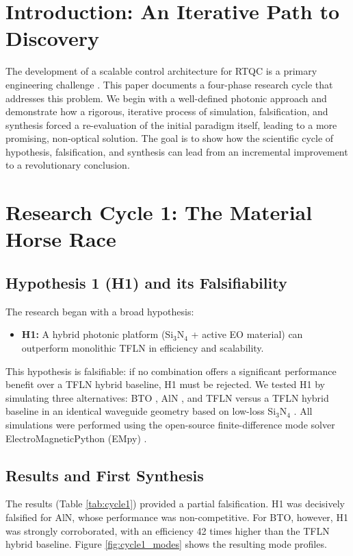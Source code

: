 \documentclass{article}
\begin{document}
\section{Introduction: An Iterative Path to Discovery}
The development of a scalable control architecture for RTQC is a primary engineering challenge \cite{TFLNreview}. This paper documents a four-phase research cycle that addresses this problem. We begin with a well-defined photonic approach and demonstrate how a rigorous, iterative process of simulation, falsification, and synthesis forced a re-evaluation of the initial paradigm itself, leading to a more promising, non-optical solution. The goal is to show how the scientific cycle of hypothesis, falsification, and synthesis can lead from an incremental improvement to a revolutionary conclusion.

\section{Research Cycle 1: The Material Horse Race}
\subsection{Hypothesis 1 (H1) and its Falsifiability}
The research began with a broad hypothesis:
\begin{itemize}
    \item \textbf{H1:} A hybrid photonic platform (Si$_3$N$_4$ + active EO material) can outperform monolithic TFLN in efficiency and scalability.
\end{itemize}
This hypothesis is falsifiable: if no combination offers a significant performance benefit over a TFLN hybrid baseline, H1 must be rejected. We tested H1 by simulating three alternatives: BTO \cite{BTO}, AlN \cite{AlN}, and TFLN versus a TFLN hybrid baseline in an identical waveguide geometry based on low-loss Si$_3$N$_4$ \cite{SiN}. All simulations were performed using the open-source finite-difference mode solver ElectroMagneticPython (EMpy) \cite{EMpy}.

\subsection{Results and First Synthesis}
The results (Table \ref{tab:cycle1}) provided a partial falsification. H1 was decisively falsified for AlN, whose performance was non-competitive. For BTO, however, H1 was strongly corroborated, with an efficiency 42 times higher than the TFLN hybrid baseline. Figure \ref{fig:cycle1_modes} shows the resulting mode profiles.
\end{document}
